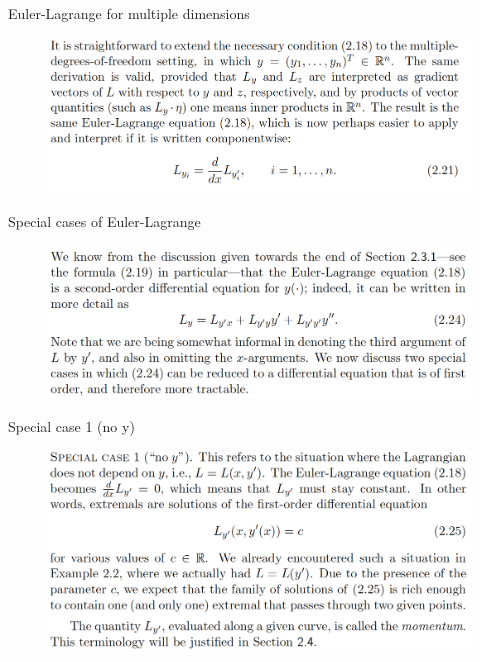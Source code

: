 \documentclass{beamer}
\begin{document}
\begin{frame}{Euler-Lagrange for multiple dimensions}
    \begin{figure}
        \centering
        \includegraphics[width=\linewidth]{ch2/fig13.png}
    \end{figure}
\end{frame}

\begin{frame}{Special cases of Euler-Lagrange}
    \begin{figure}
        \centering
        \includegraphics[width=\linewidth]{ch2/fig14.png}
    \end{figure}
\end{frame}

\begin{frame}{Special case 1 (no y)}
    \begin{figure}
        \centering
        \includegraphics[width=\linewidth]{ch2/fig15.png}
    \end{figure}
\end{frame}
\end{document}
